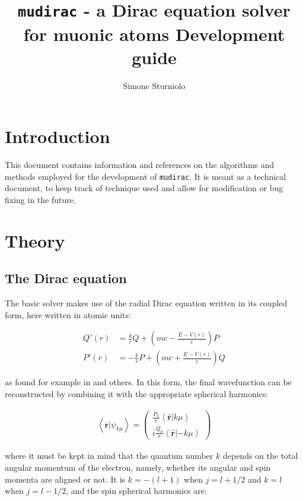 \documentclass[]{report}
\title{\texttt{mudirac} - a Dirac equation solver for muonic atoms
	\newline
	\large Development guide}
\author{Simone Sturniolo}
\newcommand{\bket}[2]{\left<#1|#2\right>}
\begin{document}
\maketitle

\chapter*{Introduction}

This document contains information and references on the algorithms and methods employed for the development of \texttt{mudirac}. It is meant as a technical document, to keep track of technique used and allow for modification or bug fixing in the future.

\chapter{Theory}

\section{The Dirac equation}

The basic solver makes use of the radial Dirac equation written in its coupled form, here written in atomic units:

\begin{align}\label{dirac_sys}
	Q'(r) &= \frac{k}{r}Q + \left(mc-\frac{E-V(r)}{c}\right)P \\
	P'(r) &= -\frac{k}{r}P + \left(mc+\frac{E-V(r)}{c}\right)Q
\end{align}

as found for example in \cite{weinb2008, silbar2010, gross1999} and others. In this form, the final wavefunction can be reconstructed by combining it with the appropriate spherical harmonics:

\begin{align}\label{dirac_wavef}
\left<\mathbf{r}|\psi_{k\mu}\right> = \begin{pmatrix}
\frac{P_k}{r}\bket{\mathbf{\hat{r}}}{k\mu} \\
i\frac{Q_k}{r}\bket{\mathbf{\hat{r}}}{-k\mu}
\end{pmatrix}
\end{align}

where it must be kept in mind that the quantum number $k$ depends on the total angular momentum of the electron, namely, whether its angular and spin momenta are aligned or not. It is $k=-(l+1)$ when $j = l+1/2$ and $k=l$ when $j=l-1/2$, and the spin spherical harmonics are:
\end{document}
